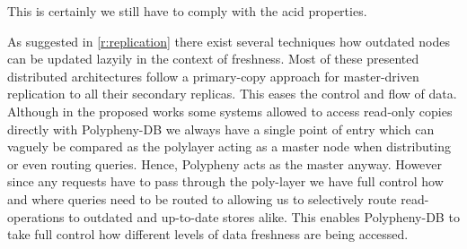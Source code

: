 


This is certainly we still have to comply with the acid properties. 



As suggested in \ref{r:replication} there exist several techniques how outdated nodes can be updated lazyily in the context of freshness.
Most of these presented distributed architectures follow a primary-copy approach for master-driven replication to all their secondary replicas.
This eases the control and flow of data. Although in the proposed works some systems allowed to access read-only copies directly
with Polypheny-DB we always have a single point of entry which can vaguely be compared as the polylayer acting as a master node
when distributing or even routing queries. Hence, Polypheny acts as the master anyway. However since any requests have to pass through the poly-layer
we have full control how and where queries need to be routed to allowing us to selectively route read-operations to outdated and up-to-date stores alike.
This enables Polypheny-DB to take full control how different levels of data freshness are being accessed.

